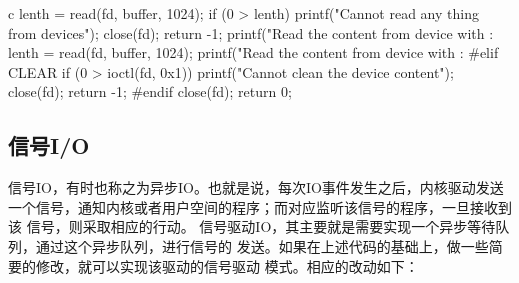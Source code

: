 \begin{code-block}{c}
{        lenth = read(fd, buffer, 1024);
        if (0 > lenth) {
                printf("Cannot read any thing from devices\n");
                close(fd);
                return -1;
        }
        printf("Read the content from device with :%
        lenth = read(fd, buffer, 1024);
        printf("Read the content from device with :%
#elif CLEAR
        if (0 > ioctl(fd, 0x1)) {
                printf("Cannot clean the device content\n");
                close(fd);
                return -1;
        }
#endif
        close(fd);
        return 0;
}
\end{code-block}

\subsection{信号I/O}
信号IO，有时也称之为异步IO。也就是说，每次IO事件发生之后，内核驱动发送
一个信号，通知内核或者用户空间的程序；而对应监听该信号的程序，一旦接收到该
信号，则采取相应的行动。
信号驱动IO，其主要就是需要实现一个异步等待队列，通过这个异步队列，进行信号的
发送。如果在上述代码的基础上，做一些简要的修改，就可以实现该驱动的信号驱动
模式。相应的改动如下：
